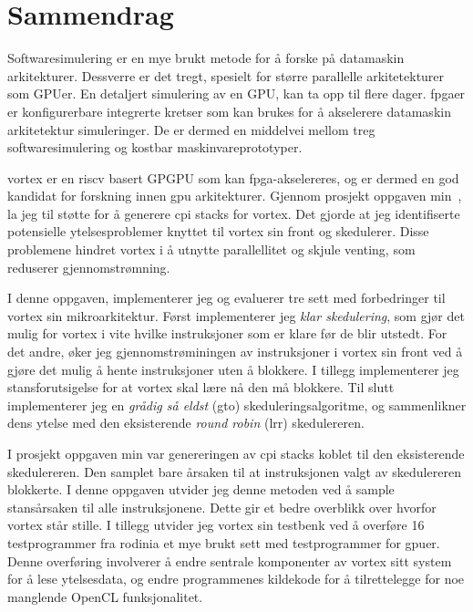 \chapter*{Sammendrag}

Softwaresimulering er en mye brukt metode for å forske på datamaskin arkitekturer. Dessverre er det tregt, spesielt for større parallelle arkitetekturer som GPUer. En detaljert simulering av en GPU, kan ta opp til flere dager. \acrshort{fpga}er er konfigurerbare integrerte kretser som kan brukes for å akselerere datamaskin arkitetektur simuleringer. De er dermed en middelvei mellom treg softwaresimulering og kostbar maskinvareprototyper.

\Gls{vortex} er en \Gls{riscv} basert GPGPU som kan \acrshort{fpga}-akselereres, og er dermed en god kandidat for forskning innen \acrshort{gpu} arkitekturer. Gjennom prosjekt oppgaven min~\cite{Aurud_Project}, la jeg til støtte for å generere \acrshort{cpi} stacks for \Gls{vortex}. Det gjorde at jeg identifiserte potensielle ytelsesproblemer knyttet til \Gls{vortex} sin front og skedulerer. Disse problemene hindret \Gls{vortex} i å utnytte parallellitet og skjule venting, som reduserer gjennomstrømning.

I denne oppgaven, implementerer jeg og evaluerer tre sett med forbedringer til \Gls{vortex} sin mikroarkitektur. Først implementerer jeg \textit{klar skedulering}, som gjør det mulig for \Gls{vortex} i vite hvilke instruksjoner som er klare før de blir utstedt. For det andre, øker jeg gjennomstrøminingen av instruksjoner i \Gls{vortex} sin front ved å gjøre det mulig å hente instruksjoner uten å blokkere. I tillegg implementerer jeg stansforutsigelse for at \Gls{vortex} skal lære nå den må blokkere. Til slutt implementerer jeg en \textit{grådig så eldst} (\acrshort{gto}) skeduleringsalgoritme, og sammenlikner dens ytelse med den eksisterende \textit{round robin} (\acrshort{lrr}) skedulereren.

I prosjekt oppgaven min var genereringen av \acrshort{cpi} stacks koblet til den eksisterende skedulereren. Den samplet bare årsaken til at instruksjonen valgt av skedulereren blokkerte. I denne oppgaven utvider jeg denne metoden ved å sample stansårsaken til alle instruksjonene. Dette gir et bedre overblikk over hvorfor \Gls{vortex} står stille. I tillegg utvider jeg \Gls{vortex} sin testbenk ved å overføre 16 testprogrammer fra \Gls{rodinia} et mye brukt sett med testprogrammer for \acrshort{gpu}er. Denne overføring involverer å endre sentrale komponenter av \Gls{vortex} sitt system for å lese ytelsesdata, og endre programmenes kildekode for å tilrettelegge for noe manglende OpenCL funksjonalitet.

